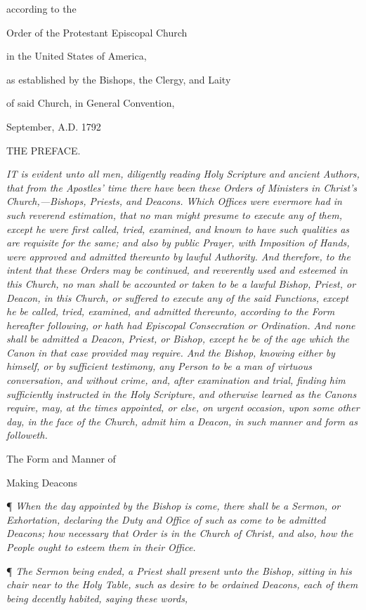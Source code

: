 according to the

Order of the Protestant Episcopal Church

in the United States of America,

as established by the Bishops, the Clergy, and Laity

of said Church, in General Convention,

September, A.D. 1792 

THE PREFACE.

\emph{I}\emph{T is evident unto all men,
diligently reading Holy Scripture and ancient Authors, that from the Apostles'
time there have been these Orders of Ministers in Christ's Church,—Bishops,
Priests, and Deacons. Which Offices were evermore had in such reverend
estimation, that no man might presume to execute any of them, except he
were first called, tried, examined, and known to have such qualities as
are requisite for the same; and also by public Prayer, with Imposition
of Hands, were approved and admitted thereunto by lawful Authority. And
therefore, to the intent that these Orders may be continued, and reverently
used and esteemed in this Church, no man shall be accounted or taken to
be a lawful Bishop, Priest, or Deacon, in this Church, or suffered to
execute any of the said Functions, except he be called, tried, examined,
and admitted thereunto, according to the Form hereafter following, or
hath had Episcopal Consecration or Ordination. And none shall be admitted a Deacon, Priest, or Bishop,
except he be of the age which the Canon in that case provided may require. And the Bishop, knowing either by himself, or by sufficient
testimony, any Person to be a man of virtuous conversation, and without
crime, and, after examination and trial, finding him sufficiently instructed
in the Holy Scripture, and otherwise learned as the Canons require, may,
at the times appointed, or else, on urgent occasion, upon some other day,
in the face of the Church, admit him a Deacon, in such manner and form
as followeth.}

The
Form and Manner of

Making
Deacons

¶ \emph{When the day appointed by the Bishop is come,
there shall be a Sermon, or Exhortation, declaring the Duty and Office
of such as come to be admitted Deacons; how necessary that Order is in
the Church of Christ, and also, how the People ought to esteem them in
their Office.}

¶ \emph{The Sermon being ended, a Priest shall present unto the Bishop,
sitting in his chair near to the Holy Table, such as desire to be ordained
Deacons, each of them being decently habited, saying these words,}

